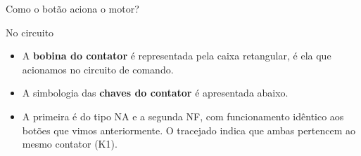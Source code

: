 \begin{frame}{Como o botão aciona o motor?}
	\begin{block}{No circuito}
		\begin{itemize}
			\item A \textbf{bobina do contator} é representada pela caixa retangular, é ela que acionamos no circuito de comando.
		\end{itemize}
	\end{block}
	\begin{center}
	\end{center}
	\begin{block}{}
		\begin{itemize}
			\item A simbologia das \textbf{chaves do contator} é apresentada abaixo.
		\end{itemize}
	\end{block}
	\begin{center}
	\end{center}
	\begin{block}{}
		\begin{itemize}
			\item A primeira é do tipo NA e a segunda NF, com funcionamento idêntico aos botões que vimos anteriormente. O tracejado indica que ambas pertencem ao mesmo contator (K1).
		\end{itemize}
	\end{block}
\end{frame}


